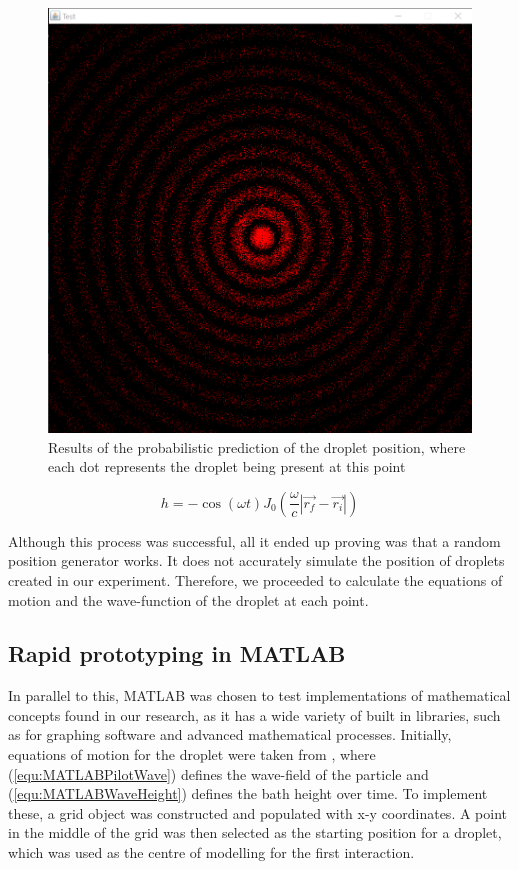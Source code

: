 \begin{figure}
\centering
\includegraphics[width=\textwidth]{simulation/probabiltyPosition.png}
\caption{Results of the probabilistic prediction of the droplet position, where each dot represents the droplet being present at this point}
\label{fig:probabilisticPrediction}
\end{figure}

\begin{equation}
    h = -\cos(\omega t) J_0(\frac{\omega}{c} |\vec{r_f}-\vec{r_i}|)
    \label{equ:probWaveEqn}
\end{equation}

Although this process was successful, all it ended up proving was that a random position generator works. It does not accurately simulate the position of droplets created in our experiment. Therefore, we proceeded to calculate the equations of motion and the wave-function of the droplet at each point.

\subsection{Rapid prototyping in MATLAB}
In parallel to this, MATLAB was chosen to test implementations of mathematical concepts found in our research, as it has a wide variety of built in libraries, such as for graphing software and advanced mathematical processes. Initially, equations of motion for the droplet were taken from \cite{oza2013trajectory}, where (\ref{equ:MATLABPilotWave}) defines the wave-field of the particle and (\ref{equ:MATLABWaveHeight}) defines the bath height over time. To implement these, a grid object was constructed and populated with x-y coordinates. A point in the middle of the grid was then selected as the starting position for a droplet, which was used as the centre of modelling for the first interaction.


